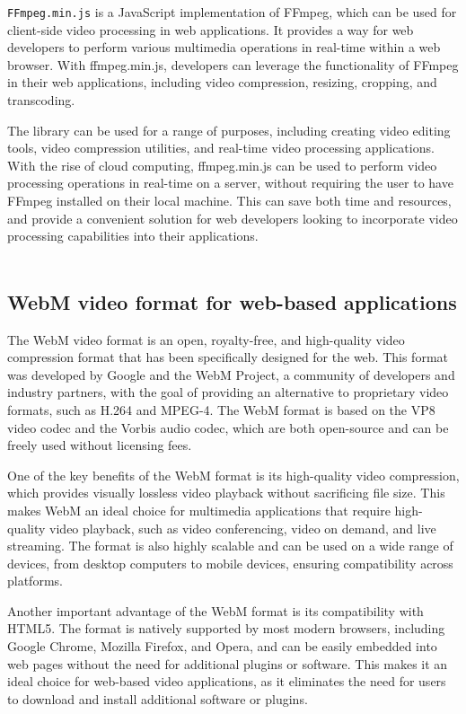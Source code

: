 \texttt{FFmpeg.min.js} is a JavaScript implementation of FFmpeg, which can be used for client-side video 
processing in web applications. It provides a way for web developers to perform various multimedia 
operations in real-time within a web browser. With ffmpeg.min.js, developers can leverage the 
functionality of FFmpeg in their web applications, including video compression, resizing, cropping, and transcoding.

The library can be used for a range of purposes, including creating video editing tools, video 
compression utilities, and real-time video processing applications. With the rise of cloud computing, 
ffmpeg.min.js can be used to perform video processing operations in real-time on a server, without requiring 
the user to have FFmpeg installed on their local machine. This can save both time and resources, and provide 
a convenient solution for web developers looking to incorporate video processing capabilities into their applications. \cite{ffmpeg}
\\
\\
\subsection{WebM video format for web-based applications}
The WebM video format is an open, royalty-free, and high-quality video compression format 
that has been specifically designed for the web. This format was developed by Google and 
the WebM Project, a community of developers and industry partners, with the goal of 
providing an alternative to proprietary video formats, such as H.264 and MPEG-4. 
The WebM format is based on the VP8 video codec and the Vorbis audio codec, 
which are both open-source and can be freely used without licensing fees.

One of the key benefits of the WebM format is its high-quality video compression, 
which provides visually lossless video playback without sacrificing file size. 
This makes WebM an ideal choice for multimedia applications that require 
high-quality video playback, such as video conferencing, video on demand, and live streaming. The format 
is also highly scalable and can be used on a wide range of devices, from desktop computers to mobile 
devices, ensuring compatibility across platforms.

Another important advantage of the WebM format is its compatibility with HTML5. The format is 
natively supported by most modern browsers, including Google Chrome, Mozilla Firefox, and Opera, 
and can be easily embedded into web pages without the need for additional plugins or software. 
This makes it an ideal choice for web-based video applications, as it eliminates the need for 
users to download and install additional software or plugins.

